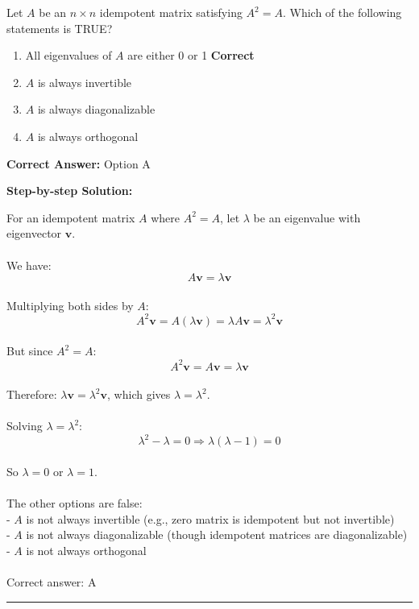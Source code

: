 \documentclass[11pt]{article}
\begin{document}
Let \(A\) be an \(n \times n\) idempotent matrix satisfying \(A^2 = A\). Which of the following statements is TRUE?


\begin{enumerate}[label=\textbf{\Alph*.}, leftmargin=1.8em]
\item All eigenvalues of \(A\) are either 0 or 1 \hfill {\color{gategreen}\textbf{Correct}}\item \(A\) is always invertible\item \(A\) is always diagonalizable\item \(A\) is always orthogonal\end{enumerate}

\textbf{Correct Answer:} Option A

\textbf{Step-by-step Solution:}

For an idempotent matrix \(A\) where \(A^2 = A\), let \(\lambda\) be an eigenvalue with eigenvector \(\mathbf{v}\).\\
\\
We have:\\
\[A\mathbf{v} = \lambda\mathbf{v}\]\\
Multiplying both sides by \(A\):\\
\[A^2\mathbf{v} = A(\lambda\mathbf{v}) = \lambda A\mathbf{v} = \lambda^2\mathbf{v}\]\\
But since \(A^2 = A\):\\
\[A^2\mathbf{v} = A\mathbf{v} = \lambda\mathbf{v}\]\\
Therefore: \(\lambda\mathbf{v} = \lambda^2\mathbf{v}\), which gives \(\lambda = \lambda^2\).\\
\\
Solving \(\lambda = \lambda^2\):\\
\[\lambda^2 - \lambda = 0 \Rightarrow \lambda(\lambda - 1) = 0\]\\
So \(\lambda = 0\) or \(\lambda = 1\).\\
\\
The other options are false:\\
- \(A\) is not always invertible (e.g., zero matrix is idempotent but not invertible)\\
- \(A\) is not always diagonalizable (though idempotent matrices are diagonalizable)\\
- \(A\) is not always orthogonal\\
\\
Correct answer: A

\vspace{0.8em}
\hrule
\vspace{0.4em}
\end{document}
